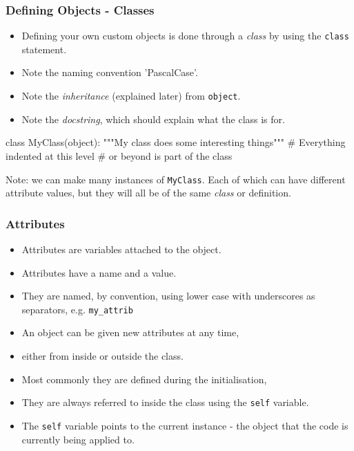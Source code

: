 \documentclass{beamer}
\begin{document}
\begin{frame}[fragile]
\frametitle{Defining Objects - Classes}
\begin{itemize}
\item Defining your own custom objects is done through a \emph{class}
by using the \lstinline|class| statement.
\item Note the naming convention 'PascalCase'.
\item Note the \emph{inheritance} (explained later) from \lstinline|object|.
\item Note the \emph{docstring}, which should explain what the class is for.
\end{itemize}
\begin{code}
class MyClass(object):
	"""My class does some interesting things"""
  # Everything indented at this level 
  # or beyond is part of the class
\end{code}
Note: we can make many instances of \lstinline|MyClass|. 
Each of which can have different attribute values,
but they will all be of the same \emph{class} or definition.

\end{frame}



\begin{frame}[fragile]
\frametitle{Attributes}

\begin{itemize}
\item Attributes are variables attached to the object.
\item Attributes have a name and a value.
\item They are named, by convention, using lower case with underscores as separators, 
e.g. \lstinline|my_attrib|
\item An object can be given new attributes at any time,
\item either from inside or outside the class.
\item Most commonly they are defined during the initialisation,
\item They are always referred to inside the class using the \lstinline|self| variable.
\item The \lstinline|self| variable points to the current instance - 
the object that the code is currently being applied to.
\end{itemize}
%
\end{frame}
\end{document}
